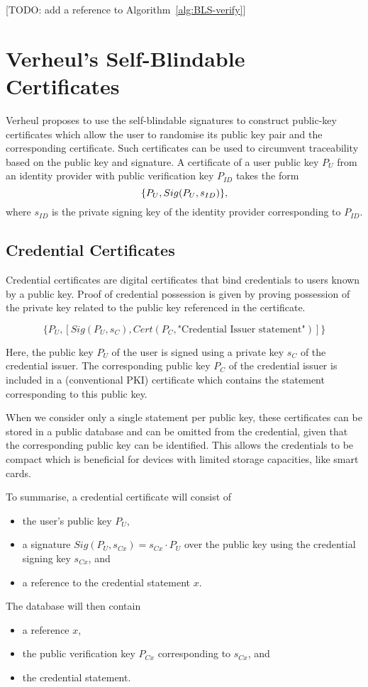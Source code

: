 [TODO: add a reference to Algorithm~\ref{alg:BLS-verify}]

\section{Verheul's Self-Blindable Certificates}

Verheul proposes to use the self-blindable signatures to construct public-key
certificates which allow the user to randomise its public key pair and the
corresponding certificate. Such certificates can be used to circumvent
traceability based on the public key and signature. A certificate of a user
public key $P_U$ from an identity provider with public verification key $P_{ID}$
takes the form
\begin{equation}\label{eqn:SB-certificate}
  \{ P_U, Sig(P_U, s_{ID}) \}\text,
\end{equation}
where $s_{ID}$ is the private signing key of the identity provider corresponding
to $P_{ID}$.

\subsection{Credential Certificates}

Credential certificates are digital certificates that bind credentials to users
known by a public key. Proof of credential possession is given by proving
possession of the private key related to the public key referenced in the
certificate.

$$\{P_U, [Sig(P_U, s_C), Cert(P_C, \text{"Credential Issuer statement"})]\}$$

Here, the public key $P_U$ of the user is signed using a private key $s_C$ of
the credential issuer. The corresponding public key $P_C$ of the credential
issuer is included in a (conventional PKI) certificate which contains the
statement corresponding to this public key.

When we consider only a single statement per public key, these certificates can
be stored in a public database and can be omitted from the credential, given
that the corresponding public key can be identified. This allows the credentials
to be compact which is beneficial for devices with limited storage capacities,
like smart cards.

To summarise, a credential certificate will consist of
\begin{itemize}
  \item the user's public key $P_U$,
  \item a signature $Sig(P_U, s_{Cx}) = s_{Cx} \cdot P_U$ over the public key
    using the credential signing key $s_{Cx}$, and
  \item a reference to the credential statement $x$.
\end{itemize}
The database will then contain
\begin{itemize}
  \item a reference $x$,
  \item the public verification key $P_{Cx}$ corresponding to $s_{Cx}$, and
  \item the credential statement.
\end{itemize}

